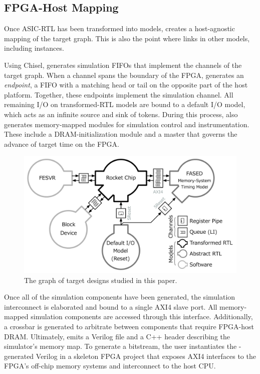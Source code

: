 \subsection{FPGA-Host Mapping}

Once ASIC-RTL has been transformed into models, \SIMNAME creates a host-agnostic
mapping of the target graph. This is also the point where \SIMNAME links in
other models, including \PNAME instances.

Using Chisel, \SIMNAME generates simulation FIFOs that implement the channels of
the target graph.  When a channel spans the boundary of the FPGA, \SIMNAME
generates an \emph{endpoint}, a FIFO with a matching head or tail on the
opposite part of the host platform.  Together, these endpoints implement the
simulation channel.  All remaining I/O on transformed-RTL models
are bound to a default I/O model, which acts as an infinite source and sink of
tokens.  During this process, \SIMNAME also generates memory-mapped modules for
simulation control and instrumentation. These include a DRAM-initialization
module and a master that governs the advance of target time on the FPGA.

\begin{figure}[t]
    \centering
    \includegraphics[width=\columnwidth]{figures/target-graph.pdf}
    \caption{The graph of target designs studied in this paper.}
    \label{fig:default-target}
\end{figure}

Once all of the simulation components have been generated, the simulation
interconnect is elaborated and bound to a single AXI4 slave port. All
memory-mapped simulation components are accessed through this
interface. Additionally, a crossbar is generated to arbitrate between components
that require FPGA-host DRAM. Ultimately, \SIMNAME emits a Verilog file and a
C++ header describing the simulator's memory map. To generate a bitstream, the
user instantiates the \SIMNAME-generated Verilog in a skeleton FPGA project
that exposes AXI4 interfaces to the FPGA's off-chip memory systems and
interconnect to the host CPU.

